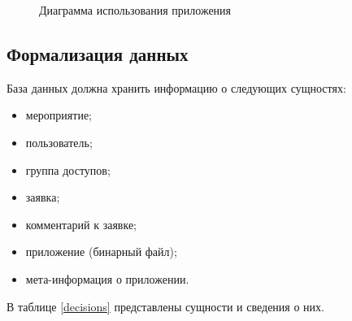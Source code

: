 \begin{figure}[h!]
	\caption{Диаграмма использования приложения}
	\label{fig:UseCase}
\end{figure}

\pagebreak

\subsection{Формализация данных}

База данных должна хранить информацию о следующих сущностях:

\begin{itemize}[label=---]
	\item мероприятие;
	\item пользователь;
	\item группа доступов;
	\item заявка;
	\item комментарий к заявке;
	\item приложение (бинарный файл);
	\item мета-информация о приложении.
\end{itemize}


В таблице \ref{decisions} представлены сущности и сведения о них.

